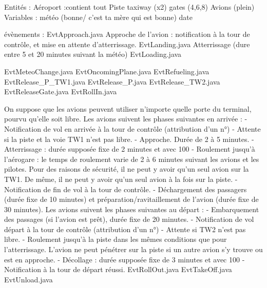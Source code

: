 
Entités :
  Aéroport :contient tout
  Piste
  taxiway (x2)
  gates (4,6,8)
  Avions (plein)
Variables :
  météo (bonne/ c'est ta mère qui est bonne)
  date
  
  
évènements :
  EvtApproach.java
  Approche de l'avion : notification à la tour de contrôle, et mise en attente d'atterrissage.
  EvtLanding.java
  Atterrissage (dure entre 5 et 20 minutes suivant la météo)
  EvtLoading.java
  
  EvtMeteoChange.java
  EvtOncomingPlane.java
  EvtRefueling.java
  EvtRelease_P_TW1.java
  EvtRelease_P.java
  EvtRelease_TW2.java
  EvtReleaseGate.java
  EvtRollIn.java
  
  On suppose que les avions peuvent utiliser n’importe quelle porte du terminal, pourvu qu’elle soit libre.
Les avions suivent les phases suivantes en arrivée :
- Notification de vol en arrivée à la tour de contrôle (attribution d’un n°)
- Attente si la piste et la voie TW1 n’est pas libre.
  - Approche. Durée de 2 à 5 minutes.
- Atterrissage : durée supposée fixe de 2 minutes et avec 100%
- Roulement jusqu’à l’aérogare : le temps de roulement varie de 2 à 6 minutes suivant les avions et les pilotes. Pour des raisons de sécurité, il ne peut y avoir qu’un seul avion sur la TW1. De même, il ne peut y avoir qu’un seul avion à la fois sur la piste.
- Notification de fin de vol à la tour de contrôle.
- Déchargement des passagers (durée fixe de 10 minutes) et préparation/ravitaillement de l’avion (durée fixe de 30 minutes).
Les avions suivent les phases suivantes au départ :
- Embarquement des passages (si l’avion est prêt), durée fixe de 20 minutes.
- Notification de vol départ à la tour de contrôle (attribution d’un n°)
- Attente si TW2 n’est pas libre.
- Roulement jusqu’à la piste dans les mêmes conditions que pour l’atterrissage. L’avion ne peut pénétrer sur la piste si un autre avion s’y trouve ou est en approche.
- Décollage : durée supposée fixe de 3 minutes et avec 100%
- Notification à la tour de départ réussi.
  EvtRollOut.java
  EvtTakeOff.java
  EvtUnload.java
